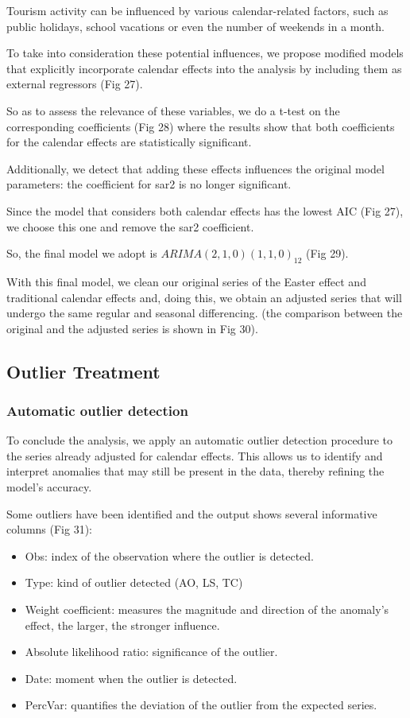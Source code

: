 \documentclass[
]{article}
\begin{document}
Tourism activity can be influenced by various calendar-related factors,
such as public holidays, school vacations or even the number of weekends
in a month.

To take into consideration these potential influences, we propose
modified models that explicitly incorporate calendar effects into the
analysis by including them as external regressors (Fig 27).

So as to assess the relevance of these variables, we do a t-test on the
corresponding coefficients (Fig 28) where the results show that both
coefficients for the calendar effects are statistically significant.

Additionally, we detect that adding these effects influences the
original model parameters: the coefficient for sar2 is no longer
significant.

Since the model that considers both calendar effects has the lowest AIC
(Fig 27), we choose this one and remove the sar2 coefficient.

So, the final model we adopt is \(ARIMA(2, 1, 0)(1, 1, 0)_{12}\) (Fig
29).

With this final model, we clean our original series of the Easter effect
and traditional calendar effects and, doing this, we obtain an adjusted
series that will undergo the same regular and seasonal differencing.
(the comparison between the original and the adjusted series is shown in
Fig 30).

\hypertarget{outlier-treatment}{%
\subsection{Outlier Treatment}\label{outlier-treatment}}

\hypertarget{automatic-outlier-detection}{%
\subsubsection{Automatic outlier
detection}\label{automatic-outlier-detection}}

To conclude the analysis, we apply an automatic outlier detection
procedure to the series already adjusted for calendar effects. This
allows us to identify and interpret anomalies that may still be present
in the data, thereby refining the model's accuracy.

Some outliers have been identified and the output shows several
informative columns (Fig 31):

\begin{itemize}
\item
  Obs: index of the observation where the outlier is detected.
\item
  Type: kind of outlier detected (AO, LS, TC)
\item
  Weight coefficient: measures the magnitude and direction of the
  anomaly's effect, the larger, the stronger influence.
\item
  Absolute likelihood ratio: significance of the outlier.
\item
  Date: moment when the outlier is detected.
\item
  PercVar: quantifies the deviation of the outlier from the expected
  series.
\end{itemize}
\end{document}

